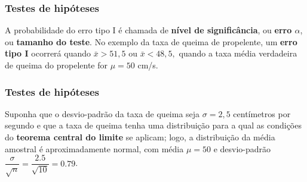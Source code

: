 \documentclass[14pt,aspectratio=1610]{beamer}
\newcommand{\bx}{\ensuremath{\bar{x}}}
\begin{document}
\begin{frame}{}
\frametitle{Testes de hipóteses}
\begin{block}{}
\justifying
A probabilidade do erro tipo I é chamada de \textbf{nível de significância}, ou \textbf{erro $\alpha$}, ou \textbf{tamanho do teste}. No exemplo da taxa de queima de 
propelente, um \textbf{erro tipo I} ocorrerá quando $ \bx> 51,5$ ou $\bx < 48,5,$ quando a taxa média verdadeira de queima do propelente for $\mu = 50$ cm/s. 
\end{block}
\end{frame}

\begin{frame}{}
\frametitle{Testes de hipóteses}
\begin{block}{}
\justifying
Suponha que o desvio-padrão da taxa de queima seja $\sigma = 2,5$ centímetros por segundo e que a taxa de queima tenha uma distribuição para a qual as condições do 
\textbf{teorema central do limite} se aplicam; logo, a distribuição da média amostral é aproximadamente normal, com média $\mu = 50$ e desvio-padrão 
$\dfrac{\sigma}{\sqrt{n}}=\dfrac{2.5}{\sqrt{10}}=0.79$.
\end{block}
\end{frame}
\end{document}
